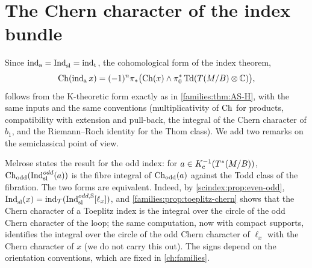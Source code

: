 \section{The Chern character of the index bundle}\label{scindex:sec:chern}

Since $\operatorname{ind}_{\mathrm{a}}=\operatorname{Ind}^{}_{\mathrm{sl}}=\operatorname{ind}_{\mathrm{t}}$, the cohomological form of the index theorem,
\begin{equation*}
  \operatorname{Ch}(\operatorname{ind}_{\mathrm{a}} x)=(-1)^n\pi_*\bigl(\operatorname{Ch}(x)\wedge\pi_0^*\operatorname{Td}(T(M/B)\otimes\mathbb{C})\bigr),
\end{equation*}
follows from the K-theoretic form exactly as in \cref{families:thm:AS-H}, with the same
inputs and the same conventions (multiplicativity of $\operatorname{Ch}$ for products,
compatibility with extension and pull-back, the integral of the Chern character of
$b_1$, and the Riemann--Roch identity for the Thom class). We add two remarks on
the semiclassical point of view.

\begin{remark}\label{scindex:rem:odd-chern}
  Melrose states the result for the odd index: for $a\in K_{\mathrm{c}}^{-1}(T^*(M/B))$,
  $\operatorname{Ch}_{\mathrm{odd}}(\operatorname{Ind}^{odd}_{\mathrm{sl}}(a))$ is the fibre integral of
  $\operatorname{Ch}_{\mathrm{odd}}(a)$ against the Todd class of the fibration. The two forms
  are equivalent. Indeed, by \cref{scindex:prop:even-odd}, $\operatorname{Ind}^{}_{\mathrm{sl}}(x)=
  \operatorname{ind}_{\mathcal T}(\operatorname{Ind}^{odd,\mathbb{S}}_{\mathrm{sl}}[\ell_x])$, and \cref{families:prop:toeplitz-chern} shows that the Chern character
  of a Toeplitz index is the integral over the circle of the odd Chern character
  of the loop; the same computation, now with compact supports, identifies the
  integral over the circle of the odd Chern character of $\ell_x$ with the Chern
  character of $x$ (we do not carry this out). The signs depend on the orientation
  conventions, which are fixed in \cref{ch:families}.
\end{remark}

